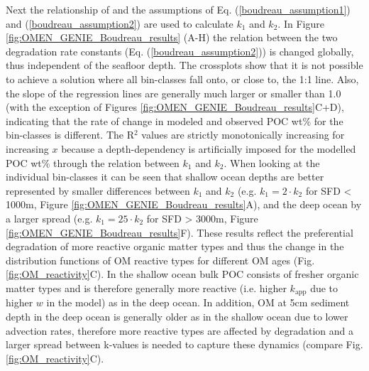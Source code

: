 \documentclass[gmd, manuscript]{copernicus}
\begin{document}
Next the relationship of \citet{boudreau1997diagenetic} and the assumptions of Eq. (\ref{boudreau_assumption1}) and (\ref{boudreau_assumption2}) are used to calculate $k_1$ 
and $k_2$. In Figure \ref{fig:OMEN_GENIE_Boudreau_results} (A-H) the relation between the two degradation rate constants (Eq. (\ref{boudreau_assumption2})) is changed globally, thus independent of the seafloor depth. 
The crossplots show that it is not possible to achieve a solution where all bin-classes fall onto, or close to, the 1:1 line. Also, the slope of the regression lines are generally much larger or smaller than 1.0 
(with the exception of Figures \ref{fig:OMEN_GENIE_Boudreau_results}C+D), indicating that the rate of change in modeled and observed POC wt\% for the bin-classes is different. 
The R$^2$ values are strictly monotonically increasing for increasing $x$ because a depth-dependency is artificially imposed for the modelled POC wt\% through the relation between $k_1$ and $k_2$. 
When looking at the individual bin-classes it can be seen that shallow ocean depths are better represented by smaller differences between $k_1$ and $k_2$ (e.g. $k_1 = 2 \cdot k_2$ for SFD < 1000m, Figure \ref{fig:OMEN_GENIE_Boudreau_results}A),
and the deep ocean by a larger spread (e.g. $k_1 = 25 \cdot k_2$ for SFD > 3000m, Figure \ref{fig:OMEN_GENIE_Boudreau_results}F). 
These results reflect the preferential degradation of more reactive organic matter types \citep{wakeham_compositions_1997, lee_composition_2000} and thus the change in the distribution functions of OM reactive types for different OM ages (Fig. \ref{fig:OM_reactivity}C). 
In the shallow ocean bulk POC consists of fresher organic matter types and is therefore generally more reactive (i.e. higher $k_\mathrm{app}$ due to higher $w$ in the model) as in the deep ocean. In addition, OM at 5cm sediment depth in the deep ocean 
is generally older as in the shallow ocean due to lower advection rates, therefore more reactive types are affected by degradation and a larger spread between k-values is needed to capture these dynamics (compare Fig. \ref{fig:OM_reactivity}C). 
\end{document}
